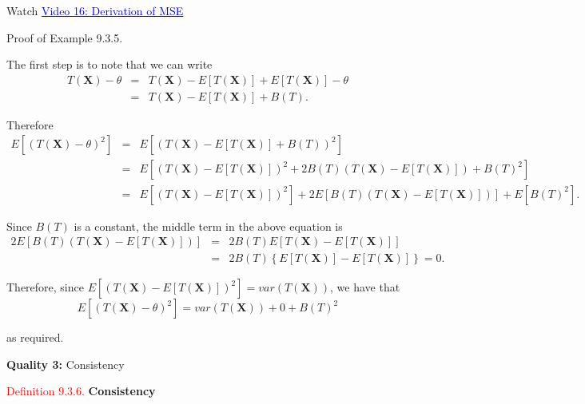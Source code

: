 \documentclass[
]{book}
\begin{document}
Watch \href{https://mediaspace.nottingham.ac.uk/media/Mean+Square+Error+FINAL+VERSION/1_l2469xgp}{\textcolor{blue}{Video 16: Derivation of MSE}}

Proof of Example 9.3.5.

The first step is to note that we can write\\

\begin{eqnarray*} 
T (\mathbf{X}) - \theta &=& T (\mathbf{X}) - E[T (\mathbf{X})] + E[T (\mathbf{X})] - \theta \\ 
&=& T (\mathbf{X}) - E[T (\mathbf{X})] + B(T). 
\end{eqnarray*}

Therefore\\

\begin{eqnarray*} E \left[ \left( T(\mathbf{X}) - \theta \right) ^2 \right] &=& 
E \left[ \left( T (\mathbf{X}) - E[T (\mathbf{X})] + B(T) \right) ^2 \right] \\
&=& 
E \left[ \left( T (\mathbf{X}) - E[T (\mathbf{X})] \right)^2 + 2 B(T) \left( T (\mathbf{X}) - E[T (\mathbf{X})] \right) + B(T)^2\right] \\
&=& E \left[ \left( T (\mathbf{X}) - E[T (\mathbf{X})] \right)^2 \right] + 2 E \left[ B(T) \left( T (\mathbf{X}) - E[T (\mathbf{X})] \right) \right] + E \left[ B(T)^2\right]. 
\end{eqnarray*}

Since \(B(T)\) is a constant, the middle term in the above equation is\\

\begin{eqnarray*} 
2 E \left[ B(T) \left( T (\mathbf{X}) - E[T (\mathbf{X})] \right) \right]  &=& 2 B(T) E \left[ T (\mathbf{X}) - E[T (\mathbf{X})] \right] \\ &=& 2 B(T) \left\{E[T (\mathbf{X})] -E[T (\mathbf{X})] \right\} =0. 
\end{eqnarray*}

Therefore, since \(E \left[ \left( T (\mathbf{X}) - E[T (\mathbf{X})] \right)^2 \right] = var (T (\mathbf{X}))\), we have that\\

\[ E \left[ \left( T(\mathbf{X}) - \theta \right) ^2 \right]  = var (T (\mathbf{X})) + 0 + B(T)^2 \]

as required.

{\textbf{Quality 3:} Consistency}

\leavevmode{}%
\textcolor{red}{Definition 9.3.6.}
{\textbf{Consistency}}
\end{document}
